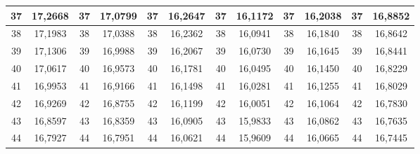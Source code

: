 \documentclass[a4paper,12pt]{article} %
\begin{document}
\begin{longtable}[c]{cccccccccc|c|c|}
	\multicolumn{1}{|c|}{37} & \multicolumn{1}{c|}{17,2668} & \multicolumn{1}{c|}{37} & \multicolumn{1}{c|}{17,0799} & \multicolumn{1}{c|}{37} & \multicolumn{1}{c|}{16,2647} & \multicolumn{1}{c|}{37} & \multicolumn{1}{c|}{16,1172} & \multicolumn{1}{c|}{37} & 16,2038 & 37 & 16,8852 \\ \hline
	\multicolumn{1}{|c|}{38} & \multicolumn{1}{c|}{17,1983} & \multicolumn{1}{c|}{38} & \multicolumn{1}{c|}{17,0388} & \multicolumn{1}{c|}{38} & \multicolumn{1}{c|}{16,2362} & \multicolumn{1}{c|}{38} & \multicolumn{1}{c|}{16,0941} & \multicolumn{1}{c|}{38} & 16,1840 & 38 & 16,8642 \\ \hline
	\multicolumn{1}{|c|}{39} & \multicolumn{1}{c|}{17,1306} & \multicolumn{1}{c|}{39} & \multicolumn{1}{c|}{16,9988} & \multicolumn{1}{c|}{39} & \multicolumn{1}{c|}{16,2067} & \multicolumn{1}{c|}{39} & \multicolumn{1}{c|}{16,0730} & \multicolumn{1}{c|}{39} & 16,1645 & 39 & 16,8441 \\ \hline
	\multicolumn{1}{|c|}{40} & \multicolumn{1}{c|}{17,0617} & \multicolumn{1}{c|}{40} & \multicolumn{1}{c|}{16,9573} & \multicolumn{1}{c|}{40} & \multicolumn{1}{c|}{16,1781} & \multicolumn{1}{c|}{40} & \multicolumn{1}{c|}{16,0495} & \multicolumn{1}{c|}{40} & 16,1450 & 40 & 16,8229 \\ \hline
	\multicolumn{1}{|c|}{41} & \multicolumn{1}{c|}{16,9953} & \multicolumn{1}{c|}{41} & \multicolumn{1}{c|}{16,9166} & \multicolumn{1}{c|}{41} & \multicolumn{1}{c|}{16,1498} & \multicolumn{1}{c|}{41} & \multicolumn{1}{c|}{16,0281} & \multicolumn{1}{c|}{41} & 16,1255 & 41 & 16,8029 \\ \hline
	\multicolumn{1}{|c|}{42} & \multicolumn{1}{c|}{16,9269} & \multicolumn{1}{c|}{42} & \multicolumn{1}{c|}{16,8755} & \multicolumn{1}{c|}{42} & \multicolumn{1}{c|}{16,1199} & \multicolumn{1}{c|}{42} & \multicolumn{1}{c|}{16,0051} & \multicolumn{1}{c|}{42} & 16,1064 & 42 & 16,7830 \\ \hline
	\multicolumn{1}{|c|}{43} & \multicolumn{1}{c|}{16,8597} & \multicolumn{1}{c|}{43} & \multicolumn{1}{c|}{16,8359} & \multicolumn{1}{c|}{43} & \multicolumn{1}{c|}{16,0905} & \multicolumn{1}{c|}{43} & \multicolumn{1}{c|}{15,9833} & \multicolumn{1}{c|}{43} & 16,0862 & 43 & 16,7635 \\ \hline
	\multicolumn{1}{|c|}{44} & \multicolumn{1}{c|}{16,7927} & \multicolumn{1}{c|}{44} & \multicolumn{1}{c|}{16,7951} & \multicolumn{1}{c|}{44} & \multicolumn{1}{c|}{16,0621} & \multicolumn{1}{c|}{44} & \multicolumn{1}{c|}{15,9609} & \multicolumn{1}{c|}{44} & 16,0665 & 44 & 16,7445 \\ \hline

\end{longtable}
\end{document}
